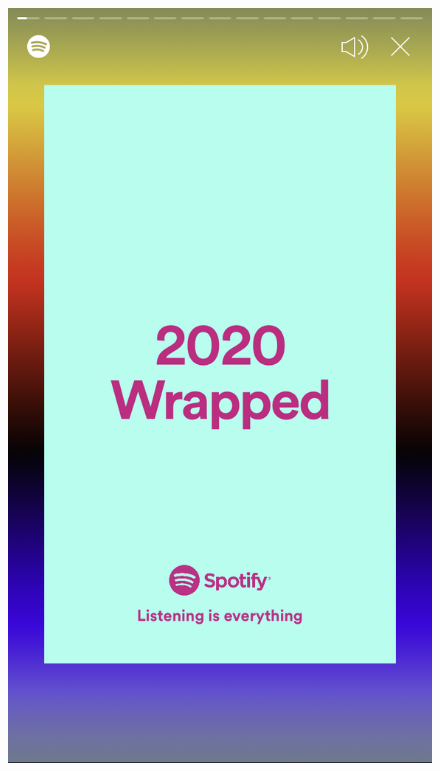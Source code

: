 \documentclass{report}
\begin{document}
%
\begin{figure}
  \centering
  \begin{minipage}[b]{0.25\textwidth}
    \includegraphics[width=\textwidth]{Imagens/2020.PNG}
  \end{minipage}
  \hfill
  \begin{minipage}[b]{0.25\textwidth}

\end{minipage}
\end{figure}
\end{document}
